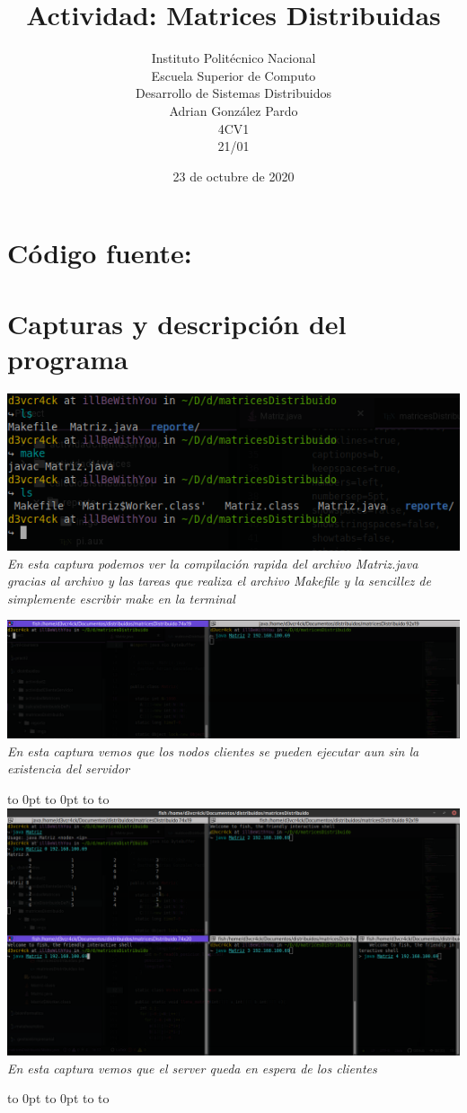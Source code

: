 \documentclass[10pt,executivepaper]{article}
\title{Actividad: Matrices Distribuidas}
\author{Instituto Politécnico Nacional\\Escuela Superior de Computo\\Desarrollo de Sistemas Distribuidos\\Adrian González Pardo\\4CV1\\21/01}
\date{23 de octubre de 2020}
\def\fillandplacepagenumber{%
 \par\pagestyle{empty}%
 \vbox to 0pt{\vss}\vfill
 \vbox to 0pt{\baselineskip0pt
   \hbox to\linewidth{\hss}%
   \baselineskip\footskip
   \hbox to\linewidth{%
     \hfil\thepage\hfil}\vss}}
\begin{document}
\maketitle
\section{Código fuente:}
\begin{center}
  
  
\end{center}
\section{Capturas y descripción del programa}
\begin{center}
  \includegraphics[scale=0.5]{imgs/compilacion.png}
  \\\textit{En esta captura podemos ver la compilación rapida del archivo Matriz.java gracias al archivo y las tareas que realiza el archivo Makefile y la sencillez de simplemente escribir make en la terminal}

  \begin{landscape}
    \includegraphics[scale=0.5]{imgs/terminal-sin-server.png}
    \\\textit{En esta captura vemos que los nodos clientes se pueden ejecutar aun sin la existencia del servidor}
    \fillandplacepagenumber
    \includegraphics[scale=0.45]{imgs/terminal-1.png}
    \\\textit{En esta captura vemos que el server queda en espera de los clientes}
    \fillandplacepagenumber


\end{landscape}
\end{center}
\end{document}
